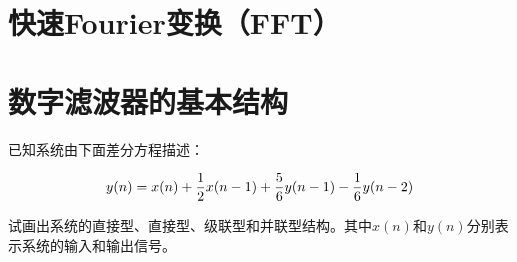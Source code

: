 \documentclass[cn, hazy, blue, normal, 14pt]{elegantnote}
\begin{document}
\section{快速Fourier变换（FFT）}




\section{数字滤波器的基本结构}

\begin{exercise}

已知系统由下面差分方程描述：

\begin{equation}
\notag
    y(n)=x(n)+\frac{1}{2}x(n-1)+\frac{5}{6}y(n-1)-\frac{1}{6}y(n-2)
\end{equation}

试画出系统的直接\uppercase\expandafter{}型、直接\uppercase\expandafter{}型、级联型和并联型结构。其中$x(n)$和$y(n)$分别表示系统的输入和输出信号。

\end{exercise}
\end{document}
